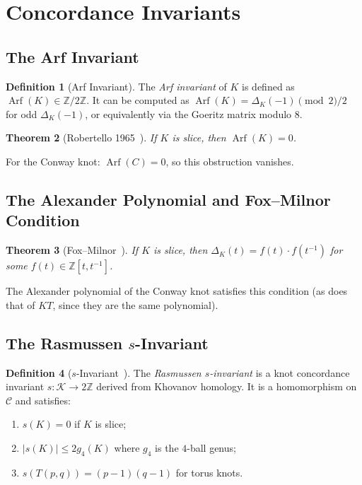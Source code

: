 \documentclass[12pt,a4paper]{amsart}
\newtheorem{theorem}{Theorem}[section]
\theoremstyle{definition}
\newtheorem{definition}[theorem]{Definition}
\theoremstyle{remark}
\DeclareMathOperator{\Arf}{Arf}
\newcommand{\Z}{\mathbb{Z}}
\begin{document}
\section{Concordance Invariants}

\subsection{The Arf Invariant}

\begin{definition}[Arf Invariant]
The \emph{Arf invariant} of $K$ is defined as $\Arf(K) \in \Z/2\Z$.
It can be computed as $\Arf(K) = \Delta_K(-1) \pmod 2 / 2$ for odd
$\Delta_K(-1)$, or equivalently via the Goeritz matrix modulo 8.
\end{definition}

\begin{theorem}[Robertello 1965~\cite{Robertello1965}]
If $K$ is slice, then $\Arf(K) = 0$.
\end{theorem}

For the Conway knot: $\Arf(C) = 0$, so this obstruction vanishes.

\subsection{The Alexander Polynomial and Fox--Milnor Condition}

\begin{theorem}[Fox--Milnor~\cite{FoxMilnor1966}]
If $K$ is slice, then $\Delta_K(t) = f(t) \cdot f(t^{-1})$ for some
$f(t) \in \Z[t, t^{-1}]$.
\end{theorem}

The Alexander polynomial of the Conway knot satisfies this condition
(as does that of $KT$, since they are the same polynomial).

\subsection{The Rasmussen \texorpdfstring{$s$}{s}-Invariant}
\label{sec:s-invariant}

\begin{definition}[$s$-Invariant~\cite{Rasmussen2010}]
The \emph{Rasmussen $s$-invariant} is a knot concordance invariant
$s \colon \mathcal{K} \to 2\Z$ derived from Khovanov homology.
It is a homomorphism on $\mathcal{C}$ and satisfies:
\begin{enumerate}[label=\roman*)]
\item $s(K) = 0$ if $K$ is slice;
\item $|s(K)| \leq 2 g_4(K)$ where $g_4$ is the $4$-ball genus;
\item $s(T(p,q)) = (p-1)(q-1)$ for torus knots.
\end{enumerate}
\end{definition}
\end{document}
